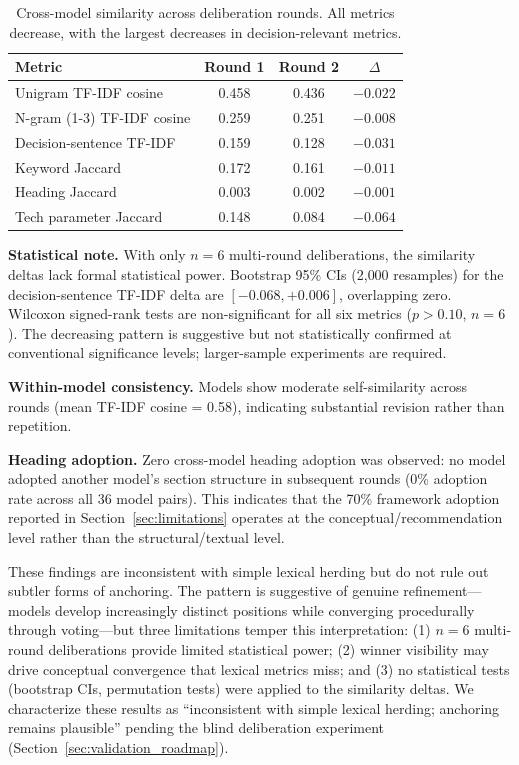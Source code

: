 \documentclass[11pt,a4paper]{article}
\begin{document}
\begin{table}[t]
\centering
\caption{Cross-model similarity across deliberation rounds. All metrics decrease, with the largest decreases in decision-relevant metrics.}
\label{tab:similarity}
\begin{tabular}{lccc}
\toprule
Metric & Round 1 & Round 2 & $\Delta$ \\
\midrule
Unigram TF-IDF cosine & 0.458 & 0.436 & $-0.022$ \\
N-gram (1-3) TF-IDF cosine & 0.259 & 0.251 & $-0.008$ \\
Decision-sentence TF-IDF & 0.159 & 0.128 & $-0.031$ \\
Keyword Jaccard & 0.172 & 0.161 & $-0.011$ \\
Heading Jaccard & 0.003 & 0.002 & $-0.001$ \\
Tech parameter Jaccard & 0.148 & 0.084 & $-0.064$ \\
\bottomrule
\end{tabular}
\end{table}

\textbf{Statistical note.} With only $n = 6$ multi-round deliberations, the similarity deltas lack formal statistical power. Bootstrap 95\% CIs (2{,}000 resamples) for the decision-sentence TF-IDF delta are $[-0.068, +0.006]$, overlapping zero. Wilcoxon signed-rank tests are non-significant for all six metrics ($p > 0.10$, $n = 6$). The decreasing pattern is suggestive but not statistically confirmed at conventional significance levels; larger-sample experiments are required.

\textbf{Within-model consistency.} Models show moderate self-similarity across rounds (mean TF-IDF cosine = 0.58), indicating substantial revision rather than repetition.

\textbf{Heading adoption.} Zero cross-model heading adoption was observed: no model adopted another model's section structure in subsequent rounds (0\% adoption rate across all 36 model pairs). This indicates that the 70\% framework adoption reported in Section~\ref{sec:limitations} operates at the conceptual/recommendation level rather than the structural/textual level.

These findings are inconsistent with simple lexical herding but do not rule out subtler forms of anchoring. The pattern is suggestive of genuine refinement---models develop increasingly distinct positions while converging procedurally through voting---but three limitations temper this interpretation: (1) $n = 6$ multi-round deliberations provide limited statistical power; (2) winner visibility may drive conceptual convergence that lexical metrics miss; and (3) no statistical tests (bootstrap CIs, permutation tests) were applied to the similarity deltas. We characterize these results as ``inconsistent with simple lexical herding; anchoring remains plausible'' pending the blind deliberation experiment (Section~\ref{sec:validation_roadmap}).
\end{document}
